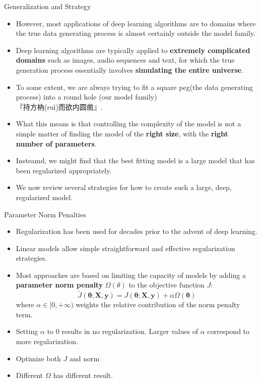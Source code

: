\documentclass[10pt]{beamer}
\begin{document}
	\begin{frame}{Generalization and Strategy}
		\begin{itemize}
			\item However, most applications of deep learning algorithms are to domains where the true data generating process is almost certainly outside the model family.
			\pause
			\item Deep learning algorithms are typically applied to \textbf{extremely complicated domains} such as images, audio sequences and text, for which the true generation process essentially involves \textbf{simulating the entire universe}.
			\pause
			\item To some extent, we are always trying to fit a square peg(the data generating process) into a round hole (our model family)\\ 『持方枘(ruì)而欲内圆凿』.
			\pause
			\item What this means is that controlling the complexity of the model is not a simple matter of finding the model of the \textbf{right size}, with the \textbf{right number of parameters}.
			\pause
			\item Insteamd, we might find that the best fitting model is a large model that has been regularized appropriately.
			\pause
			\item We now review several strategies for how to create such a large, deep, regularized model.
		\end{itemize}
	\end{frame}
	
	\begin{frame}{Parameter Norm Penalties}
		\begin{itemize}
			\item Regularization has been used for decades prior to the advent of deep learning.
			\pause
			\item Linear models allow simple straightforward and effective regularization strategies.
			\pause
			\item Most approaches are based on limiting the capacity of models by adding a \textbf{parameter norm penalty} $\Omega(\theta)$ to the objective function $J$:
			$$\tilde{\mathit{J}}(\bm{\theta};\bm{X},\bm{y})=\mathit{J}(\bm{\theta};\bm{X},\bm{y})+\alpha\Omega(\bm{\theta})$$
			where $\alpha\in[0,+\infty)$ weights the relative contribution of the norm penalty term.
			\pause
			\item Setting $\alpha$ to 0 results in no regularization. Larger values of $\alpha$ correspond to more regularization.
			\pause
			\item Optimize both $J$ and norm
			\pause
			\item Different $\Omega$ has different result.
		\end{itemize}
	\end{frame}
	
\end{document}
